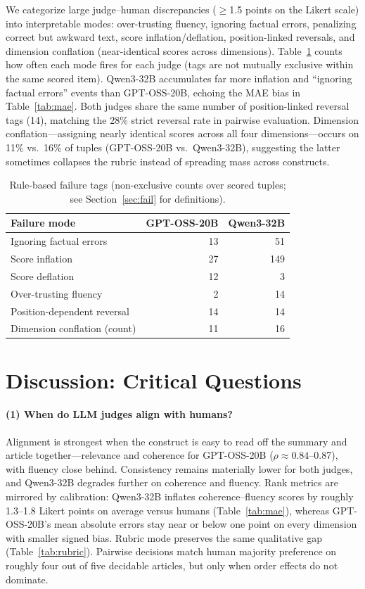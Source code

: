\documentclass[11pt]{article}
\begin{document}
We categorize large judge--human discrepancies ($\geq$1.5 points on the Likert scale) into interpretable modes: over-trusting fluency, ignoring factual errors, penalizing correct but awkward text, score inflation/deflation, position-linked reversals, and dimension conflation (near-identical scores across dimensions). Table~\ref{tab:fail} counts how often each mode fires for each judge (tags are not mutually exclusive within the same scored item). Qwen3-32B accumulates far more inflation and ``ignoring factual errors'' events than GPT-OSS-20B, echoing the MAE bias in Table~\ref{tab:mae}. Both judges share the same number of position-linked reversal tags (14), matching the 28\% strict reversal rate in pairwise evaluation. Dimension conflation---assigning nearly identical scores across all four dimensions---occurs on 11\% vs.\ 16\% of tuples (GPT-OSS-20B vs.\ Qwen3-32B), suggesting the latter sometimes collapses the rubric instead of spreading mass across constructs.

\begin{table}[t]
\centering
\footnotesize
\setlength{\tabcolsep}{4pt}
\begin{tabular}{@{}lrr@{}}
\toprule
Failure mode & GPT-OSS-20B & Qwen3-32B \\
\midrule
Ignoring factual errors & 13 & 51 \\
Score inflation & 27 & 149 \\
Score deflation & 12 & 3 \\
Over-trusting fluency & 2 & 14 \\
Position-dependent reversal & 14 & 14 \\
Dimension conflation (count) & 11 & 16 \\
\bottomrule
\end{tabular}
\caption{Rule-based failure tags (non-exclusive counts over scored tuples; see Section~\ref{sec:fail} for definitions).}
\label{tab:fail}
\end{table}

\section{Discussion: Critical Questions}

\paragraph{(1) When do LLM judges align with humans?}
Alignment is strongest when the construct is easy to read off the summary and article together---relevance and coherence for GPT-OSS-20B ($\rho{\approx}0.84$--0.87), with fluency close behind. Consistency remains materially lower for both judges, and Qwen3-32B degrades further on coherence and fluency. Rank metrics are mirrored by calibration: Qwen3-32B inflates coherence--fluency scores by roughly 1.3--1.8 Likert points on average versus humans (Table~\ref{tab:mae}), whereas GPT-OSS-20B's mean absolute errors stay near or below one point on every dimension with smaller signed bias. Rubric mode preserves the same qualitative gap (Table~\ref{tab:rubric}). Pairwise decisions match human majority preference on roughly four out of five decidable articles, but only when order effects do not dominate.
\end{document}
